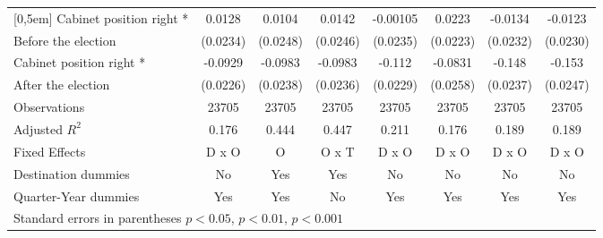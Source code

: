 \begin{table}[htbp]
\begin{tabular}{l*{7}{c}}
[0,5em]
Cabinet position right * &      0.0128         &      0.0104         &      0.0142         &    -0.00105         &      0.0223         &     -0.0134         &     -0.0123         \\
Before the election                    &    (0.0234)         &    (0.0248)         &    (0.0246)         &    (0.0235)         &    (0.0223)         &    (0.0232)         &    (0.0230)         \\
[0,5em]
Cabinet position right * &     -0.0929\sym{***}&     -0.0983\sym{***}&     -0.0983\sym{***}&      -0.112\sym{***}&     -0.0831\sym{**} &      -0.148\sym{***}&      -0.153\sym{***}\\
After the election                    &    (0.0226)         &    (0.0238)         &    (0.0236)         &    (0.0229)         &    (0.0258)         &    (0.0237)         &    (0.0247)         \\
\hline
Observations        &       23705         &       23705         &       23705         &       23705         &       23705         &       23705         &       23705         \\
Adjusted \(R^{2}\)  &       0.176         &       0.444         &       0.447         &       0.211         &       0.176         &       0.189         &       0.189         \\
Fixed Effects       &       D x O         &           O         &       O x T         &       D x O         &       D x O         &       D x O         &       D x O         \\
Destination dummies &          No         &         Yes         &         Yes         &          No         &          No         &          No         &          No         \\
Quarter-Year dummies&         Yes         &         Yes         &          No         &         Yes         &         Yes         &         Yes         &         Yes         \\
\hline\hline
\multicolumn{8}{l}{ Standard errors in parentheses \sym{*} \(p<0.05\), \sym{**} \(p<0.01\), \sym{***} \(p<0.001\)}\\
\end{tabular}
\end{table}
